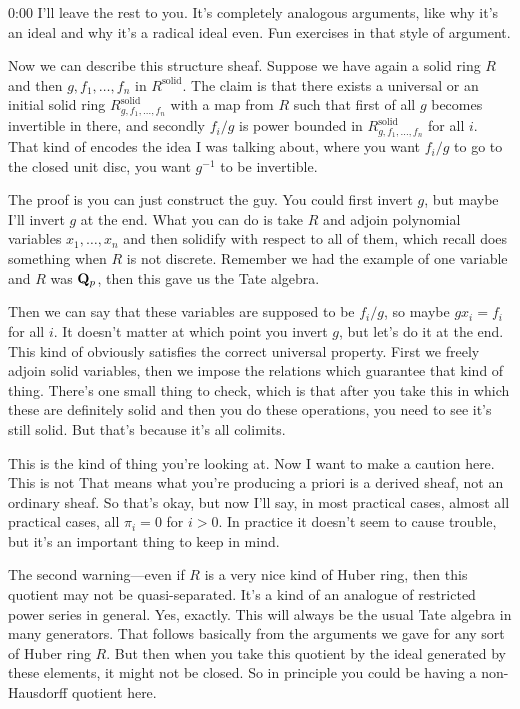 \begin{unfinished}{0:00}
I'll leave the rest to you. It's completely analogous arguments, like why it's an ideal and why it's a radical ideal even. Fun exercises in that style of argument.

Now we can describe this structure sheaf. Suppose we have again a solid ring $R$ and then $g, f_1, \dots, f_n$ in $R^\mathrm{solid}$. The claim is that there exists a universal or an initial solid ring $R^\mathrm{solid}_{g,f_1,\dots,f_n}$ with a map from $R$ such that first of all $g$ becomes invertible in there, and secondly $f_i/g$ is power bounded in $R^\mathrm{solid}_{g,f_1,\dots,f_n}$ for all $i$. That kind of encodes the idea I was talking about, where you want $f_i/g$ to go to the closed unit disc, you want $g^{-1}$ to be invertible.

The proof is you can just construct the guy. You could first invert $g$, but maybe I'll invert $g$ at the end. What you can do is take $R$ and adjoin polynomial variables $x_1, \dots, x_n$ and then solidify with respect to all of them, which recall does something when $R$ is not discrete. Remember we had the example of one variable and $R$ was $\mathbf Q_p$, then this gave us the Tate algebra.

Then we can say that these variables are supposed to be $f_i/g$, so maybe $gx_i = f_i$ for all $i$. It doesn't matter at which point you invert $g$, but let's do it at the end. This kind of obviously satisfies the correct universal property. First we freely adjoin solid variables, then we impose the relations which guarantee that kind of thing. There's one small thing to check, which is that after you take this in which these are definitely solid and then you do these operations, you need to see it's still solid. But that's because it's all colimits.

This is the kind of thing you're looking at. Now I want to make a caution here. This is not
That means what you're producing a priori is a derived sheaf, not an ordinary sheaf. So that's okay, but now I'll say, in most practical cases, almost all practical cases, all $\pi_i = 0$ for $i > 0$. In practice it doesn't seem to cause trouble, but it's an important thing to keep in mind.

The second warning---even if $R$ is a very nice kind of Huber ring, then this quotient may not be quasi-separated. It's a kind of an analogue of restricted power series in general. Yes, exactly. This will always be the usual Tate algebra in many generators. That follows basically from the arguments we gave for any sort of Huber ring $R$. But then when you take this quotient by the ideal generated by these elements, it might not be closed. So in principle you could be having a non-Hausdorff quotient here.


\end{unfinished}
